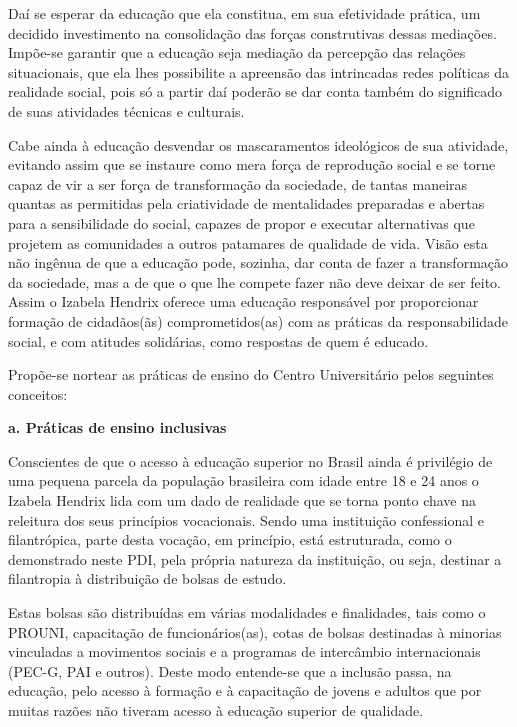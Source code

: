 \documentclass[a4paper, 12pt, openright, oneside, german, french, english, brazil]{abntex2}
\begin{document}
Daí se esperar da educação que ela constitua, em sua efetividade prática, um decidido investimento na consolidação das forças construtivas dessas mediações. Impõe-se garantir que a educação seja mediação da percepção das relações situacionais, que ela lhes possibilite a apreensão das intrincadas redes políticas da realidade social, pois só a partir daí poderão se dar conta também do significado de suas atividades técnicas e culturais.

Cabe ainda à educação desvendar os mascaramentos ideológicos de sua atividade, evitando assim que se instaure como mera força de reprodução social e se torne capaz de vir a ser força de transformação da sociedade, de tantas maneiras quantas as permitidas pela criatividade de mentalidades preparadas e abertas para a sensibilidade do social, capazes de propor e executar alternativas que projetem as comunidades a outros patamares de qualidade de vida. Visão esta não ingênua de que a educação pode, sozinha, dar conta de fazer a transformação da sociedade, mas a de que o que lhe compete fazer não deve deixar de ser feito. Assim o Izabela Hendrix oferece uma educação responsável por proporcionar formação de cidadãos(ãs) comprometidos(as) com as práticas da responsabilidade social, e com atitudes solidárias, como respostas de quem é educado.

Propõe-se nortear as práticas de ensino do Centro Universitário pelos seguintes conceitos:

\textbf{a. Práticas de ensino inclusivas}

Conscientes de que o acesso à educação superior no Brasil ainda é privilégio de uma pequena parcela da população brasileira com idade entre 18 e 24 anos o Izabela Hendrix lida com um dado de realidade que se torna ponto chave na releitura dos seus princípios vocacionais. Sendo uma instituição confessional e filantrópica, parte desta vocação, em princípio, está estruturada, como o demonstrado neste PDI, pela própria natureza da instituição, ou seja, destinar a filantropia à distribuição de bolsas de estudo.

Estas bolsas são distribuídas em várias modalidades e finalidades, tais como o PROUNI, capacitação de funcionários(as), cotas de bolsas destinadas à minorias vinculadas a movimentos sociais e a programas de intercâmbio internacionais (PEC-G, PAI e outros). Deste modo entende-se que a inclusão passa, na educação, pelo acesso à formação e à capacitação de jovens e adultos que por muitas razões não tiveram acesso à educação superior de qualidade.
\end{document}
